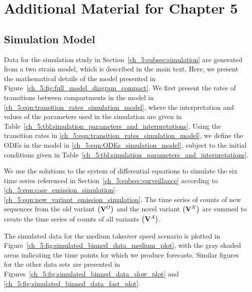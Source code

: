 \chapter{Additional Material for Chapter 5}
\graphicspath{{figures/ch_5/}}

\section{Simulation Model}
\label{ch_5:sec:full_simulation_model_explanation}

Data for the simulation study in Section~\ref{ch_5:subsec:simulation} are generated from a two strain model, which is described in the main text.
Here, we present the mathematical details of the model presented in Figure~\ref{ch_5:fig:full_model_diagram_compact}.
We first present the rates of transitions between compartments in the model in \eqref{ch_5:eqn:transition_rates_simulation_model}, where the interpretation and values of the parameters used in the simulation are given in Table~\ref{ch_5:tbl:simulation_parameters_and_interpretations}.
Using the transition rates in \eqref{ch_5:eqn:transition_rates_simulation_model}, we define the ODEs in the model in \eqref{ch_5:eqn:ODEs_simulation_model}, subject to the initial conditions given in Table~\ref{ch_5:tbl:simulation_parameters_and_interpretations}.

We use the solutions to the system of differential equations to simulate the six time series referenced in Section~\ref{ch_5:subsec:surveillance}  according to \eqref{ch_5:eqn:case_emission_simulation}--\eqref{ch_5:eqn:new_variant_emission_simulation}.
The time series of counts of new sequences from the old variant \( \left( \mathbf{V}^O \right) \) and the novel variant \( \left( \mathbf{V}^N \right) \) are summed to create the time series of counts of all variants \( \left( \mathbf{V}^A \right) \).

The simulated data for the medium takeover speed scenario is plotted in Figure~\ref{ch_5:fig:simulated_binned_data_medium_plot}, with the gray shaded areas indicating the time points for which we produce forecasts.
Similar figures for the other data sets are presented in Figures~\ref{ch_5:fig:simulated_binned_data_slow_plot} and \ref{ch_5:fig:simulated_binned_data_fast_plot}.

